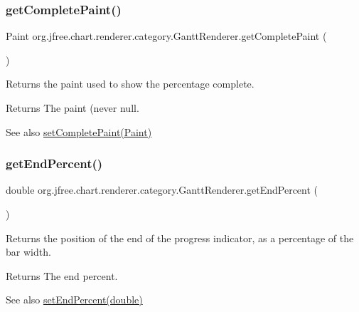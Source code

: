 \subsubsection{\texorpdfstring{get\+Complete\+Paint()}{getCompletePaint()}}
{\footnotesize\ttfamily Paint org.\+jfree.\+chart.\+renderer.\+category.\+Gantt\+Renderer.\+get\+Complete\+Paint (\begin{DoxyParamCaption}{ }\end{DoxyParamCaption})}

Returns the paint used to show the percentage complete.

\begin{DoxyReturn}{Returns}
The paint (never {\ttfamily null}.
\end{DoxyReturn}
\begin{DoxySeeAlso}{See also}
\mbox{\hyperlink{classorg_1_1jfree_1_1chart_1_1renderer_1_1category_1_1_gantt_renderer_a1c8e067f9e946aae2f936646c0334bd7}{set\+Complete\+Paint(\+Paint)}} 
\end{DoxySeeAlso}
\mbox{\label{classorg_1_1jfree_1_1chart_1_1renderer_1_1category_1_1_gantt_renderer_a4675717c2d315a0b9281d5de28f2a1dd}} 
\subsubsection{\texorpdfstring{get\+End\+Percent()}{getEndPercent()}}
{\footnotesize\ttfamily double org.\+jfree.\+chart.\+renderer.\+category.\+Gantt\+Renderer.\+get\+End\+Percent (\begin{DoxyParamCaption}{ }\end{DoxyParamCaption})}

Returns the position of the end of the progress indicator, as a percentage of the bar width.

\begin{DoxyReturn}{Returns}
The end percent.
\end{DoxyReturn}
\begin{DoxySeeAlso}{See also}
\mbox{\hyperlink{classorg_1_1jfree_1_1chart_1_1renderer_1_1category_1_1_gantt_renderer_a586fd9271c75caaebfb115052ba70fd4}{set\+End\+Percent(double)}} 
\end{DoxySeeAlso}
\mbox{\label{classorg_1_1jfree_1_1chart_1_1renderer_1_1category_1_1_gantt_renderer_a2b26bad11e194ccbe68243b368d87240}} 
